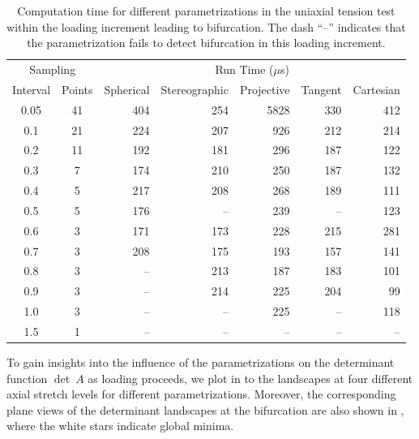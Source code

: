 \documentclass[12pt]{article}
\numberwithin{equation}{section}
\begin{document}
\begin{table}[!htbp]
  \begin{center}
    \begin{tabular}{c c | r r r r r}
      \toprule
      \multicolumn{2}{c}{Sampling} & \multicolumn{5}{c}{Run Time ($\mu$s)} \\
      Interval  & Points  & Spherical & Stereographic & Projective &
      Tangent & Cartesian \\
      \midrule
      0.05  &  41  &  404  & 254  &  5828  &  330  &  412   \\
      0.1  &  21  &  224  & 207  &  926   &  212  &  214   \\
      0.2  &  11  &  192  & 181  &  296   &  187  &  122   \\
      0.3  &  7  &  174  & 210  &  250   &  187  &  132   \\
      0.4  &  5  &  217  & 208  &  268   &  189  &  111   \\
      0.5  &  5  &	176  & --  &  239   &  --   &  123   \\
      0.6  &  3  &	171  & 173  &  228   &  215  &  281   \\
      0.7  &  3  &	208  & 175 	  &  193   &  157  &  141   \\
      0.8  &  3  &  --  & 213  &  187   &  183  &  101   \\
      0.9  &  3  &	 --  & 214  &  225   &  204  &  99   \\
      1.0  &  3  &  --  & --	  &  225   &  --   &  118   \\
      1.5  &  1  &	 --  & --	  &  --   &  --   &  --   \\
      \bottomrule
    \end{tabular}
    \caption{Computation time for different parametrizations in the
      uniaxial tension test within the loading increment leading to
      bifurcation.  The dash ``--'' indicates that the parametrization
      fails to detect bifurcation in this loading increment.}
    \label{tab:aniso-uniaxial-runtime}
  \end{center}
\end{table}

To gain insights into the influence of the parametrizations on the
determinant function $\det~A$ as loading proceeds, we plot in
 to  the
landscapes at four different axial stretch levels for different
parametrizations. Moreover, the corresponding plane views of the 
determinant landscapes at the bifurcation are also shown in
, where the white stars indicate global
minima.
\end{document}
